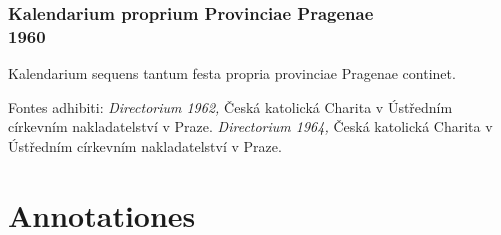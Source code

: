 \documentclass[12pt, a5paper, twoside]{book}
\begin{document}
\section*{Kalendarium proprium Provinciae Pragenae\\1960}

{\footnotesize
  Kalendarium sequens tantum festa propria provinciae Pragenae
  continet.

  Fontes adhibiti:
  \emph{Directorium 1962,} Česká katolická Charita v Ústředním církevním nakladatelství v Praze.
  \emph{Directorium 1964,} Česká katolická Charita v Ústředním církevním nakladatelství v Praze.
}


\cleardoublepage




\part{Annotationes}




\printbibliography
\end{document}
